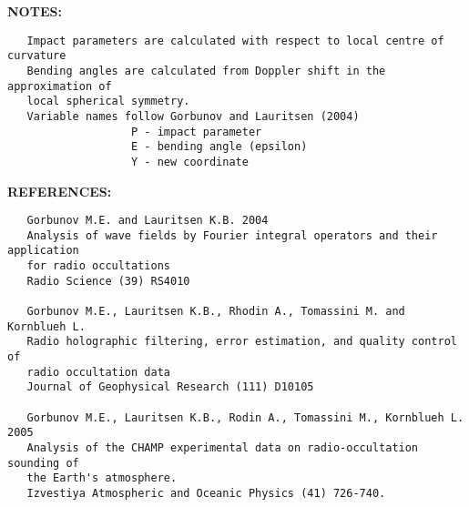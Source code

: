 \textbf{NOTES:}\hspace{0.08in}\begin{Verbatim}
   Impact parameters are calculated with respect to local centre of curvature
   Bending angles are calculated from Doppler shift in the approximation of
   local spherical symmetry.
   Variable names follow Gorbunov and Lauritsen (2004)
                   P - impact parameter
                   E - bending angle (epsilon)
                   Y - new coordinate
\end{Verbatim}
\textbf{REFERENCES:}\hspace{0.08in}\begin{Verbatim}
   Gorbunov M.E. and Lauritsen K.B. 2004
   Analysis of wave fields by Fourier integral operators and their application
   for radio occultations
   Radio Science (39) RS4010

   Gorbunov M.E., Lauritsen K.B., Rhodin A., Tomassini M. and Kornblueh L.
   Radio holographic filtering, error estimation, and quality control of
   radio occultation data
   Journal of Geophysical Research (111) D10105

   Gorbunov M.E., Lauritsen K.B., Rodin A., Tomassini M., Kornblueh L. 2005
   Analysis of the CHAMP experimental data on radio-occultation sounding of
   the Earth's atmosphere.
   Izvestiya Atmospheric and Oceanic Physics (41) 726-740.
\end{Verbatim}
